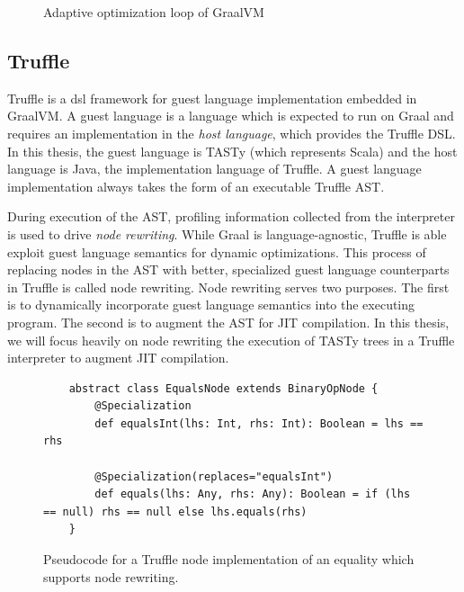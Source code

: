 \begin{figure}[!htb]
	\centering
	\caption{Adaptive optimization loop of GraalVM}
\end{figure}

\subsection{Truffle}

Truffle is a \acrfull{dsl} framework for guest language implementation embedded in GraalVM.
A guest language is a language which is expected to run on Graal and requires an implementation in the \textit{host language}, which provides the Truffle DSL.
In this thesis, the guest language is TASTy (which represents Scala) and the host language is Java, the implementation language of Truffle.
A guest language implementation always takes the form of an executable Truffle AST.

During execution of the AST, profiling information collected from the interpreter is used to drive \textit{node rewriting}.
While Graal is language-agnostic, Truffle is able exploit guest language semantics for dynamic optimizations.
This process of replacing nodes in the AST with better, specialized guest language counterparts in Truffle is called node rewriting.
Node rewriting serves two purposes.
The first is to dynamically incorporate guest language semantics into the executing program.
The second is to augment the AST for JIT compilation. 
In this thesis, we will focus heavily on node rewriting the execution of TASTy trees in a Truffle interpreter to augment JIT compilation.

\begin{figure}[!htb]
	\begin{verbatim}
	abstract class EqualsNode extends BinaryOpNode {
		@Specialization
		def equalsInt(lhs: Int, rhs: Int): Boolean = lhs == rhs
		
		@Specialization(replaces="equalsInt")
		def equals(lhs: Any, rhs: Any): Boolean = if (lhs == null) rhs == null else lhs.equals(rhs)
	}
	\end{verbatim}
	\caption{Pseudocode for a Truffle node implementation of an equality which supports node rewriting.}
	\label{example:node-rewriting}
\end{figure}

